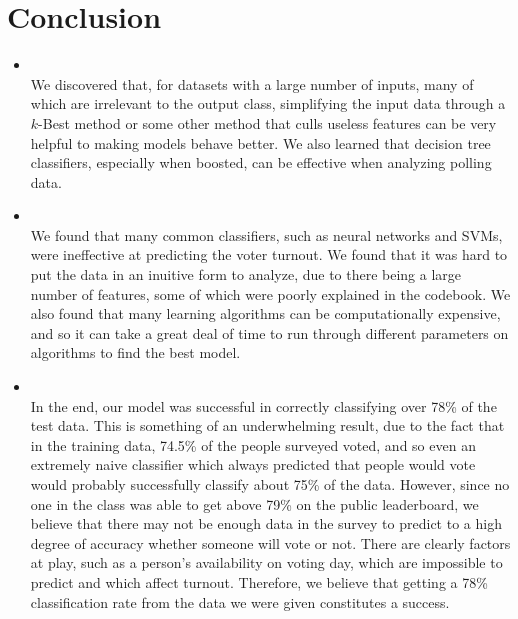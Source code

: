 \section{Conclusion}
\medskip
\begin{itemize}

    \item {} \\
    We discovered that, for datasets with a large number of inputs, many of which are irrelevant to the output class, simplifying the input data through a $k$-Best method or some other method that culls useless features can be very helpful to making models behave better. We also learned that decision tree classifiers, especially when boosted, can be effective when analyzing polling data.

    \item {} \\
    We found that many common classifiers, such as neural networks and SVMs, were ineffective at predicting the voter turnout. We found that it was hard to put the data in an inuitive form to analyze, due to there being a large number of features, some of which were poorly explained in the codebook. We also found that many learning algorithms can be computationally expensive, and so it can take a great deal of time to run through different parameters on algorithms to find the best model.

    \item {} \\
    In the end, our model was successful in correctly classifying over 78\% of the test data. This is something of an underwhelming result, due to the fact that in the training data, 74.5\% of the people surveyed voted, and so even an extremely naive classifier which always predicted that people would vote would probably successfully classify about 75\% of the data. However, since no one in the class was able to get above 79\% on the public leaderboard, we believe that there may not be enough data in the survey to predict to a high degree of accuracy whether someone will vote or not. There are clearly factors at play, such as a person's availability on voting day, which are impossible to predict and which affect turnout. Therefore, we believe that getting a 78\% classification rate from the data we were given constitutes a success.

\end{itemize}




